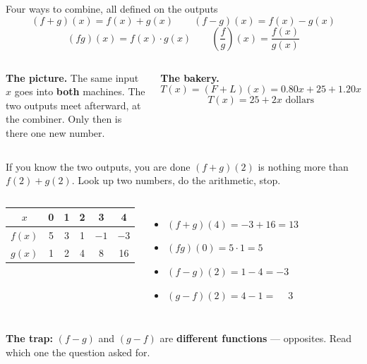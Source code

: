 \documentclass[aspectratio=169, 11pt]{beamer}
\begin{document}
\begin{frame}[t, plain]

  \begin{block}{Four ways to combine, all defined on the outputs}
    \[ (f+g)(x) = f(x) + g(x) \qquad (f-g)(x) = f(x) - g(x) \]
    \[ (fg)(x) = f(x) \cdot g(x) \qquad \left(\frac{f}{g}\right)(x) = \frac{f(x)}{g(x)} \]
  \end{block}

  \medskip
  \begin{columns}[T]
      \textbf{The picture.} The same input \(x\) goes into \textbf{both}
      machines. The two outputs meet afterward, at the combiner. Only then is
      there one new number.

      \textbf{The bakery.}
      \[ T(x) = (F + L)(x) = 0.80x + 25 + 1.20x \]
      \[ T(x) = 25 + 2x \text{ dollars} \]
  \end{columns}
\end{frame}

\begin{frame}[t, plain]

  \begin{block}{If you know the two outputs, you are done}
    \((f+g)(2)\) is nothing more than \(f(2) + g(2)\). Look up two numbers, do
    the arithmetic, stop.
  \end{block}

  \medskip
  \begin{columns}[T]
      \begin{center}
      \begin{tabular}{|c|c|c|c|c|c|}
      \hline
      \(x\) & 0 & 1 & 2 & 3 & 4 \\ \hline
      \(f(x)\) & 5 & 3 & 1 & \(-1\) & \(-3\) \\ \hline
      \(g(x)\) & 1 & 2 & 4 & 8 & 16 \\ \hline
      \end{tabular}
      \end{center}

      \begin{itemize}\setlength{\itemsep}{6pt}
        \item \((f+g)(4) = -3 + 16 = 13\)
        \item \((fg)(0) = 5 \cdot 1 = 5\)
        \item \((f-g)(2) = 1 - 4 = -3\)
        \item \((g-f)(2) = 4 - 1 = \phantom{-}3\)
      \end{itemize}
  \end{columns}

  \bigskip
  \textbf{The trap:} \((f-g)\) and \((g-f)\) are \textbf{different functions} ---
  opposites. Read which one the question asked for.
\end{frame}
\end{document}
